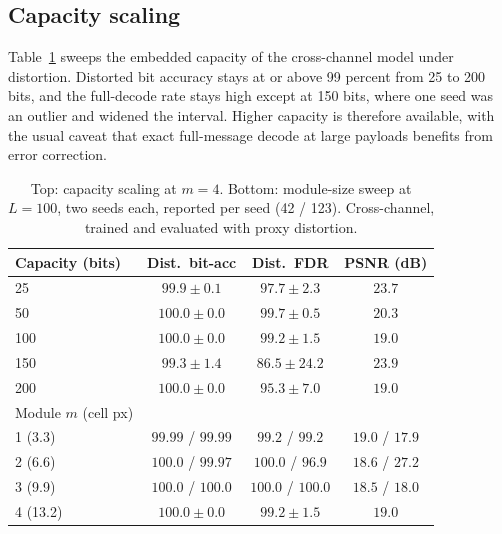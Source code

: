 \documentclass[conference]{IEEEtran}
\begin{document}
\subsection{Capacity scaling}
Table~\ref{tab:capacity} sweeps the embedded capacity of the cross-channel model under
distortion. Distorted bit accuracy stays at or above 99 percent from 25 to 200 bits, and
the full-decode rate stays high except at 150 bits, where one seed was an outlier and
widened the interval. Higher capacity is therefore available, with the usual caveat that
exact full-message decode at large payloads benefits from error correction.

\begin{table}[t]
\centering
\caption{Top: capacity scaling at $m=4$. Bottom: module-size sweep at $L=100$, two
seeds each, reported per seed (42 / 123). Cross-channel, trained and evaluated with proxy
distortion.}
\label{tab:capacity}
\begin{tabular}{lccc}
\toprule
Capacity (bits) & Dist.\ bit-acc & Dist.\ FDR & PSNR (dB) \\
\midrule
25  & $99.9\pm0.1$  & $97.7\pm2.3$  & $23.7$ \\
50  & $100.0\pm0.0$ & $99.7\pm0.5$  & $20.3$ \\
100 & $100.0\pm0.0$ & $99.2\pm1.5$  & $19.0$ \\
150 & $99.3\pm1.4$  & $86.5\pm24.2$ & $23.9$ \\
200 & $100.0\pm0.0$ & $95.3\pm7.0$  & $19.0$ \\
\midrule
Module $m$ (cell px) & & & \\
1 (3.3)  & $99.99$ / $99.99$ & $99.2$ / $99.2$   & $19.0$ / $17.9$ \\
2 (6.6)  & $100.0$ / $99.97$ & $100.0$ / $96.9$  & $18.6$ / $27.2$ \\
3 (9.9)  & $100.0$ / $100.0$ & $100.0$ / $100.0$ & $18.5$ / $18.0$ \\
4 (13.2) & $100.0\pm0.0$ & $99.2\pm1.5$ & $19.0$ \\
\bottomrule
\end{tabular}
\end{table}
\end{document}
